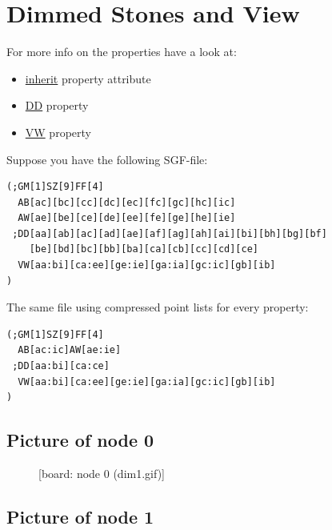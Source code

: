 \newpage

\section{Dimmed Stones and View}\label{dimmed-stones-and-view}

For more info on the properties have a look at:

\begin{itemize}
\item
  \href{https://red-bean.com/sgf/sgf4.html\#inherit}{inherit} property
  attribute
\item
  \href{https://red-bean.com/sgf/properties.html\#DD}{DD} property
\item
  \href{https://red-bean.com/sgf/properties.html\#VW}{VW} property
\end{itemize}

Suppose you have the following SGF-file:

\begin{verbatim}
(;GM[1]SZ[9]FF[4]
  AB[ac][bc][cc][dc][ec][fc][gc][hc][ic]
  AW[ae][be][ce][de][ee][fe][ge][he][ie]
 ;DD[aa][ab][ac][ad][ae][af][ag][ah][ai][bi][bh][bg][bf]
    [be][bd][bc][bb][ba][ca][cb][cc][cd][ce]
  VW[aa:bi][ca:ee][ge:ie][ga:ia][gc:ic][gb][ib]
)
\end{verbatim}

The same file using compressed point lists for every property:

\begin{verbatim}
(;GM[1]SZ[9]FF[4]
  AB[ac:ic]AW[ae:ie]
 ;DD[aa:bi][ca:ce]
  VW[aa:bi][ca:ee][ge:ie][ga:ia][gc:ic][gb][ib]
)
\end{verbatim}

\subsection{Picture of node 0}\label{picture-of-node-0}

\begin{figure}
\centering
{}
\caption{{[}board: node 0 (dim1.gif){]}}
\end{figure}

\subsection{Picture of node 1}\label{picture-of-node-1}

